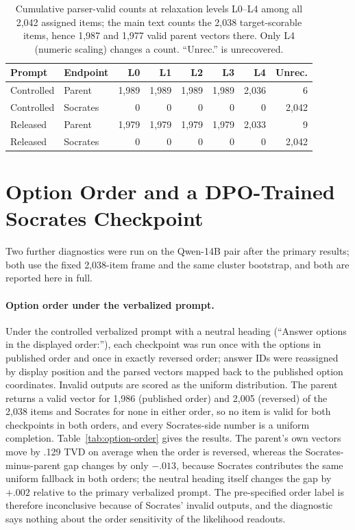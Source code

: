 \documentclass[11pt]{article}
\begin{document}
\begin{table}[!htb]
\centering
\scriptsize
\setlength{\tabcolsep}{2.5pt}
\begin{tabular}{@{}llrrrrrr@{}}
\toprule
Prompt & Endpoint & L0 & L1 & L2 & L3 & L4 & Unrec. \\
\midrule
Controlled & Parent & 1,989 & 1,989 & 1,989 & 1,989 & 2,036 & 6 \\
Controlled & Socrates & 0 & 0 & 0 & 0 & 0 & 2,042 \\
Released & Parent & 1,979 & 1,979 & 1,979 & 1,979 & 2,033 & 9 \\
Released & Socrates & 0 & 0 & 0 & 0 & 0 & 2,042 \\
\bottomrule
\end{tabular}
\caption{Cumulative parser-valid counts at relaxation levels L0--L4 among all
2,042 assigned items; the main text counts the 2,038 target-scorable items,
hence 1,987 and 1,977 valid parent vectors there. Only L4 (numeric scaling)
changes a count. ``Unrec.'' is unrecovered.}
\label{tab:parser-ladder}
\end{table}

\FloatBarrier
\section{Option Order and a DPO-Trained Socrates Checkpoint}
\label{app:diagnostics}

Two further diagnostics were run on the Qwen-14B pair after the primary
results; both use the fixed 2,038-item frame and the same cluster bootstrap,
and both are reported here in full.

\paragraph{Option order under the verbalized prompt.}
Under the controlled verbalized prompt with a neutral heading (``Answer
options in the displayed order:''), each checkpoint was run once with the
options in published order and once in exactly reversed order; answer IDs
were reassigned by display position and the parsed vectors mapped back to the
published option coordinates. Invalid outputs are scored as the uniform
distribution. The parent returns a valid vector for 1,986 (published order)
and 2,005 (reversed) of the 2,038 items and Socrates for none in either
order, so no item is valid for both checkpoints in both orders, and every
Socrates-side number is a uniform completion. Table~\ref{tab:option-order}
gives the results. The parent's own vectors move by .129 TVD on average when
the order is reversed, whereas the Socrates-minus-parent gap changes by only
$-.013$, because Socrates contributes the same uniform fallback in both
orders; the neutral heading itself changes the gap by $+.002$ relative to the
primary verbalized prompt. The pre-specified order label is therefore
inconclusive because of Socrates' invalid outputs, and the diagnostic says
nothing about the order sensitivity of the likelihood readouts.
\end{document}
